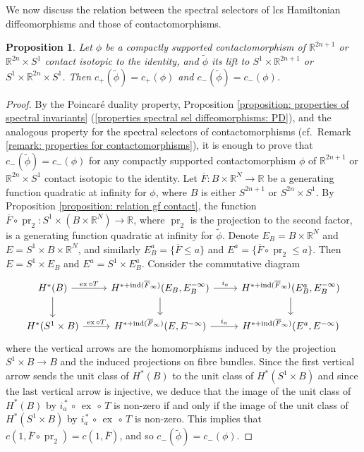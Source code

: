 \documentclass{amsart}
\DeclareMathOperator{\ex}{ex}
\DeclareMathOperator{\ind}{ind}
\DeclareMathOperator{\pr}{pr}
\newtheorem{prop}[thm]{Proposition}
\theoremstyle{remark}
\begin{document}
We now discuss the relation between the spectral selectors
of lcs Hamiltonian diffeomorphisms
and those of contactomorphisms.

\begin{prop}\label{proposition: relation spectral invariants contactomorphisms}
Let $\phi$ be a compactly supported contactomorphism
of $\mathbb{R}^{2n+1}$ or $\mathbb{R}^{2n} \times S^1$
contact isotopic to the identity,
and $\widetilde{\phi}$ its lift to $S^1 \times \mathbb{R}^{2n+1}$
or $S^1 \times \mathbb{R}^{2n} \times S^1$.
Then $c_+ (\widetilde{\phi}) = c_+ (\phi)$
and $c_- (\widetilde{\phi}) = c_- (\phi)$.
\end{prop}

\begin{proof}
By the Poincar\'e duality property,
Proposition \ref{proposition: properties of spectral invariants}
(\ref{properties spectral sel diffeomorphisms: PD}),
and the analogous property for the spectral selectors of contactomorphisms
(cf.\ Remark \ref{remark: properties for contactomorphisms}),
it is enough to prove that $c_- (\widetilde{\phi}) = c_- (\phi)$
for any compactly supported contactomorphism $\phi$
of $\mathbb{R}^{2n+1}$ or $\mathbb{R}^{2n} \times S^1$
contact isotopic to the identity.
Let $\overline{F}: B \times \mathbb{R}^N \rightarrow \mathbb{R}$
be a generating function quadratic at infinity for $\phi$,
where $B$ is either $S^{2n+1}$ or $S^{2n} \times S^1$.
By Proposition \ref{proposition: relation gf contact},
the function $\overline{F} \circ \pr_2:
S^1 \times (B \times \mathbb{R}^N) \rightarrow \mathbb{R}$,
where $\pr_2$ is the projection to the second factor,
is a generating function quadratic at infinity for $\widetilde{\phi}$.
Denote $E_B = B \times \mathbb{R}^N$ and $E = S^1 \times B \times \mathbb{R}^N$,
and similarly $E_B^{a} = \{ \overline{F} \leq a \}$
and $E^{a} = \{ \overline{F} \circ \pr_2 \leq a \}$.
Then $E = S^1 \times E_B$ and $E^{a} = S^1 \times E_B^{a}$.
Consider the commutative diagram
\[
\begin{tikzcd}
H^{\ast} (B)
\arrow{r}{\ex \circ T} \arrow{d}
& H^{\ast + \ind (\overline{F}_{\infty})} (E_B, E_B^{-\infty})
\arrow{r}{i_a} \arrow{d}
&  H^{\ast + \ind (\overline{F}_{\infty})} (E_B^a, E_B^{-\infty})
\arrow{d}\\
H^{\ast} (S^1 \times B)
\arrow{r}{\ex \circ T}
& H^{\ast + \ind (\overline{F}_{\infty})}
(E, E^{-\infty}) \arrow{r}{i_a}
&  H^{\ast + \ind (\overline{F}_{\infty})}
(E^a, E^{-\infty})
\end{tikzcd}
\]
where the vertical arrows are the homomorphisms
induced by the projection $S^1 \times B \rightarrow B$
and the induced projections on fibre bundles.
Since the first vertical arrow 
sends the unit class of $H^{\ast}(B)$
to the unit class of $H^{\ast} (S^1 \times B)$
and since the last vertical arrow is injective,
we deduce that the image of the unit class of $H^{\ast}(B)$
by $i_a^{\,\ast} \,\circ\, \ex \,\circ\, T$ is non-zero
if and only if the image of the unit class of $H^{\ast}(S^1 \times B)$
by $i_a^{\,\ast} \,\circ\, \ex \,\circ\, T$ is non-zero.
This implies that $c (1, \overline{F} \circ \pr_2) = c (1, \overline{F})$,
and so $c_- (\widetilde{\phi}) = c_- (\phi)$.
\end{proof}
\end{document}
